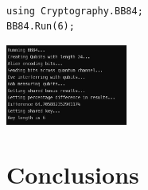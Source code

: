 \documentclass{article}
\begin{document}
\begin{lstlisting}[language={[Sharp]C}, caption={C\# Driver code sets the key length to 6}, label={Script}]

using Cryptography.BB84;
BB84.Run(6);

\end{lstlisting}

\includegraphics[width=0.3\textwidth]{BB84Output.jpg}

\section{Conclusions}

\printbibliography
\end{document}

